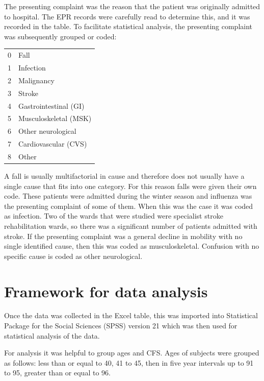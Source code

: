 \documentclass
[
	12pt,
	a4paper,
	oneside,
]{report}
\begin{document}
The presenting complaint was the reason that the patient was originally 
admitted to hospital. The EPR records were carefully read to determine this,
and it was recorded in the table. To facilitate statistical analysis, the 
presenting complaint was subsequently grouped or coded:

\begin{tabular}{ r l }
0 & Fall \\
1 & Infection \\
2 & Malignancy \\
3 & Stroke \\
4 & Gastrointestinal (GI) \\
5 & Musculoskeletal (MSK) \\
6 & Other neurological \\
7 & Cardiovascular (CVS) \\
8 & Other \\
\end{tabular}

A fall is usually multifactorial in cause \parencite{silver:12} and therefore
does not usually have a single cause that fits into one category. For this 
reason falls were given their own code.
These patients were admitted during the winter season and influenza was the
presenting complaint of some of them. When this was the case it was coded as
infection. Two of the wards that were studied were specialist stroke 
rehabilitation wards, so there was a significant number of patients admitted
with stroke. If the presenting complaint was a general decline in mobility 
with no single identified cause, then this was coded as musculoskeletal.
Confusion with no specific cause is coded as other neurological.

\section{Framework for data analysis}

Once the data was collected in the Excel table, this was imported into 
Statistical Package for the Social Sciences (SPSS) version 21 which was then
used for statistical analysis of the data.

For analysis it was helpful to group ages and CFS. Ages of subjects were 
grouped as follows: less than or equal to 40, 41 to 45, then in five year 
intervals up to 91 to 95, greater than or equal to 96.

\end{document}
